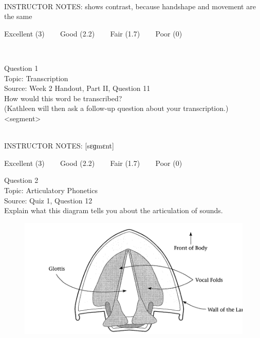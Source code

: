 \documentclass[12pt]{article}
\begin{document}
~\\
INSTRUCTOR NOTES: shows contrast, because handshape and movement are the same


\vfill
Excellent (3) ~~~ Good (2.2) ~~~ Fair (1.7) ~~~ Poor (0)
\newpage

\begin{center}
\textbf{{\color{red}{\HUGE END OF EXAM}}}\\

\end{center}
\newpage

\begin{center}
\textbf{{\color{blue}{\HUGE START OF EXAM\\}}}

\textbf{{\color{blue}{\HUGE Student ID: 78680\\}}}

\textbf{{\color{blue}{\HUGE \\}}}

\end{center}
\newpage

{\large Question 1}\\

Topic: Transcription\\
Source: Week 2 Handout, Part II, Question 11\\

How would this word be transcribed?\\ (Kathleen will then ask a follow-up question about your transcription.)\\

<segment>


~\\
INSTRUCTOR NOTES: [sɛɡmɛnt]


\vfill
Excellent (3) ~~~ Good (2.2) ~~~ Fair (1.7) ~~~ Poor (0)
\newpage

{\large Question 2}\\

Topic: Articulatory Phonetics\\
Source: Quiz 1, Question 12\\

Explain what this diagram tells you about the articulation of sounds.\\

\begin{figure}[H]
\includegraphics{../images/spreadglottis_diagram.png}
\end{figure}
\end{document}
